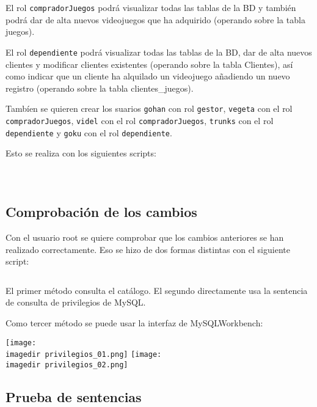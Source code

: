 \documentclass[a4paper, 11pt, oneside]{article} %
\newcommand{\scriptdir}{../scripts/} %
\newcommand{\imagedir}{../images/} %
\begin{document}
El rol \texttt{compradorJuegos} podrá visualizar todas las tablas de la BD y también podrá dar de alta nuevos videojuegos que ha adquirido (operando sobre la tabla juegos).

El rol \texttt{dependiente} podrá visualizar todas las tablas de la BD, dar de alta nuevos clientes y modificar clientes existentes (operando sobre la tabla Clientes), así como indicar que un cliente ha alquilado un videojuego añadiendo un nuevo registro (operando sobre la tabla clientes\_juegos).

Tambíen se quieren crear los suarios \texttt{gohan} con rol \texttt{gestor}, \texttt{vegeta} con el rol \texttt{compradorJuegos}, \texttt{videl} con el rol \texttt{compradorJuegos}, \texttt{trunks} con el rol \texttt{dependiente} y \texttt{goku} con el rol \texttt{dependiente}.

Esto se realiza con los siguientes scripts:

\inputminted{mysql}{\scriptdir scripts_roles/gestor.sql}

\inputminted{mysql}{\scriptdir scripts_roles/comprador_juegos_privileges_and_role_creation.sql}

\inputminted{mysql}{\scriptdir scripts_roles/dependiente_privileges_and_role_creation.sql}


\subsection{Comprobación de los cambios}

Con el usuario root se quiere comprobar que los cambios anteriores se han realizado correctamente. Eso se hizo de dos formas distintas con el siguiente script:

\inputminted{mysql}{\scriptdir scripts/scripts_consulta_privilegios/check_privileges.sql}

El primer método consulta el catálogo. El segundo directamente usa la sentencia de consulta de privilegios de MySQL.

Como tercer método se puede usar la interfaz de MySQLWorkbench:

\texttt{[image: \\imagedir privilegios\_01.png]}
\texttt{[image: \\imagedir privilegios\_02.png]}

\subsection{Prueba de sentencias}
\end{document}

